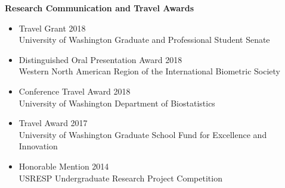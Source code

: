 \documentclass[margin]{res}
\begin{document}
\begin{resume}
\textbf{Research Communication and Travel Awards}
\begin{itemize}
\item Travel Grant \hfill 2018 \\ University of Washington Graduate and Professional Student Senate
\item Distinguished Oral Presentation Award  \hfill 2018 \\ Western North American Region of the International Biometric Society  %
\item Conference Travel Award \hfill 2018 \\
University of Washington Department of Biostatistics
\item Travel Award \hfill 2017 \\
University of Washington Graduate School Fund for Excellence and Innovation
\item Honorable Mention \hfill 2014 \\ 
USRESP Undergraduate Research Project Competition \\
\end{itemize}

    
 

\end{resume}
\end{document}
